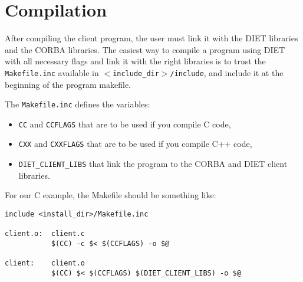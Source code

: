 


\section{Compilation}
\label{sec:cl_comp}

After compiling the client program, the user must link it with the DIET
libraries and the CORBA libraries. The easiest way to compile a program using
DIET with all necessary flags and link it with the right libraries is to trust the
\texttt{Makefile.inc} available in \texttt{$<$include\_dir$>$/include}, and
include it at the beginning of the program makefile.

The \texttt{Makefile.inc} defines the variables:
\begin{itemize}
\item \texttt{CC} and \texttt{CCFLAGS} that are to be used if you compile C
 code,
\item \texttt{CXX} and \texttt{CXXFLAGS} that are to be used if you compile C++
  code,
\item \texttt{DIET\_CLIENT\_LIBS} that link the program to the CORBA and DIET
  client libraries.
\end{itemize}

For our C example, the Makefile should be something like:
{\footnotesize
\begin{verbatim}
include <install_dir>/Makefile.inc

client.o:  client.c
           $(CC) -c $< $(CCFLAGS) -o $@

client:    client.o
           $(CC) $< $(CCFLAGS) $(DIET_CLIENT_LIBS) -o $@
\end{verbatim}
}

